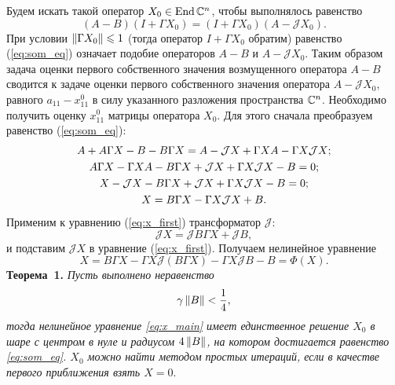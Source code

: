 
Будем искать такой оператор $X_0 \in \operatorname{End}\mathbb{C}^n$, чтобы выполнялось равенство
\begin{equation}\label{eq:som_eq}
	(A-B)(I + \Gamma X_0) = (I + \Gamma X_0)(A-\mathcal{J}X_0).
\end{equation}
При условии $\left\|\Gamma X_0\right\| \leqslant 1$ (тогда оператор $I + \Gamma X_0$ обратим) равенство (\ref{eq:som_eq}) означает подобие операторов $A-B$ и $A-\mathcal{J} X_0$. Таким образом задача оценки первого собственного значения возмущенного оператора $A-B$ сводится к задаче оценки первого собственного значения оператора $A-\mathcal{J}X_0$, равного $a_{11} - x^{0}_{11}$ в силу указанного разложения пространства $\mathbb{C}^n$. Необходимо получить оценку $x^{0}_{11}$ матрицы оператора $X_0$. Для этого сначала преобразуем равенство (\ref{eq:som_eq}):
\begin{gather}
	A + A\Gamma X - B - B\Gamma X = A - \mathcal{J}X + \Gamma X A - \Gamma X \mathcal{J}X; \notag \\
	A\Gamma X - \Gamma X A - B\Gamma X + \mathcal{J}X + \Gamma X \mathcal{J}X - B = 0; \notag \\
	X - \mathcal{J}X - B\Gamma X + \mathcal{J}X + \Gamma X \mathcal{J}X - B = 0;  \notag \\
	X = B\Gamma X - \Gamma X \mathcal{J}X + B. \label{eq:x_first}
\end{gather}
Применим к уравнению (\ref{eq:x_first}) трансформатор $\mathcal{J}$:
$$
	\mathcal{J}X = \mathcal{J}B\Gamma X + \mathcal{J}B,
$$ 
и подставим $\mathcal{J}X$ в уравнение (\ref{eq:x_first}). Получаем нелинейное уравнение
\begin{equation}\label{eq:x_main}
	X = B\Gamma X - \Gamma X \mathcal{J}(B\Gamma X) - \Gamma X \mathcal{J}B - B = \Phi(X).
\end{equation}
\noindent\textbf{Теорема~1.}
{ \it Пусть выполнено неравенство
$$
\gamma\left\|B\right\| < \frac{1}{4},
$$
тогда нелинейное уравнение \eqref{eq:x_main} имеет единственное решение $X_0$ в шаре с центром в нуле и радиусом $4\left\|B\right\|$, на котором достигается равенство \eqref{eq:som_eq}. $X_0$ можно найти методом простых итераций, если в качестве первого приближения взять $X = 0.$}

